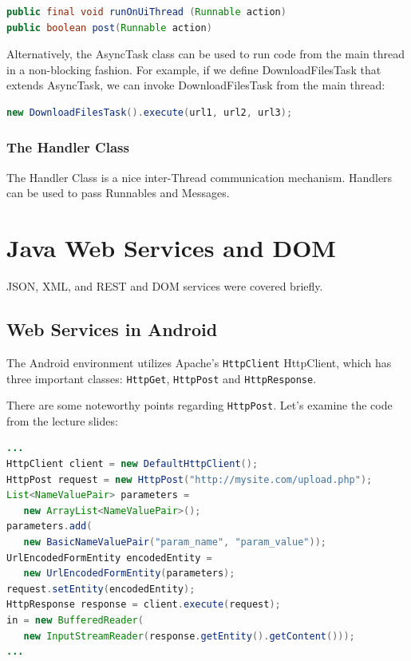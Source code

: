 \documentclass{article}
\def\cw#1{\texttt{#1}}
\begin{document}
\begin{code} \begin{lstlisting}[language=Java]
public final void runOnUiThread (Runnable action)
public boolean post(Runnable action)
\end{lstlisting} \end{code}

Alternatively, the AsyncTask class can be used to run code from the main thread in a non-blocking fashion. For example, if  we define DownloadFilesTask that extends AsyncTask, we can invoke DownloadFilesTask from the main thread:

\begin{code} \begin{lstlisting}[language=Java]
new DownloadFilesTask().execute(url1, url2, url3);
\end{lstlisting} \end{code}

\subsubsection{The Handler Class}
The Handler Class is a nice inter-Thread communication mechanism. Handlers can be used to pass Runnables and Messages. 



\section{Java Web Services and DOM}
JSON, XML, and REST and DOM services were covered briefly.

\subsection{Web Services in Android}

The Android environment utilizes Apache's \cw{HttpClient} HttpClient, which has three important classes: \cw{HttpGet}, \cw{HttpPost} and \cw{HttpResponse}. 

There are some noteworthy points regarding \cw{HttpPost}. Let's examine the code from the lecture slides:

\begin{code} \begin{lstlisting}[language=Java]
...
HttpClient client = new DefaultHttpClient();
HttpPost request = new HttpPost("http://mysite.com/upload.php");
List<NameValuePair> parameters =
   new ArrayList<NameValuePair>();
parameters.add(
   new BasicNameValuePair("param_name", "param_value"));
UrlEncodedFormEntity encodedEntity =
   new UrlEncodedFormEntity(parameters);
request.setEntity(encodedEntity);
HttpResponse response = client.execute(request);
in = new BufferedReader(
   new InputStreamReader(response.getEntity().getContent()));
...
\end{lstlisting} \end{code}
\end{document}
